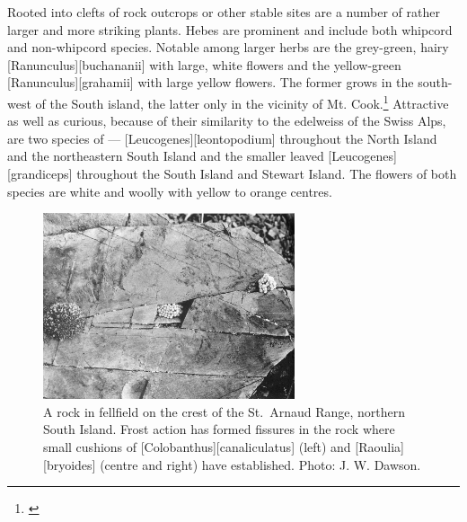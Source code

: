 Rooted into clefts of rock outcrops or other stable sites are a number of rather larger and more striking plants.
Hebes are prominent and include both whipcord and non-whipcord species.
Notable among larger herbs are the grey-green, hairy [Ranunculus][buchananii] with large, white flowers and the yellow-green [Ranunculus][grahamii] with large yellow flowers.
The former grows in the south-west of the South island, the latter only in the vicinity of Mt.
Cook.\footnote{\cite{wilson1978wild}}
Attractive as well as curious, because of their similarity to the edelweiss of the Swiss Alps, are two species of  --- [Leucogenes][leontopodium] throughout the North Island and the northeastern South Island and the smaller leaved [Leucogenes][grandiceps] throughout the South Island and Stewart Island.
The flowers of both species are white and woolly with yellow to orange centres.

\begin{figure}
	\includegraphics[width=0.66\textwidth]{graphics/figure107fellfield-rock.jpg}
	\centering
	\caption[A rock in fellfield on the crest of the St.\ Arnaud Range]{A rock in fellfield on the crest of the St.\ Arnaud Range, northern South Island.
	Frost action has formed fissures in the rock where small cushions of [Colobanthus][canaliculatus] (left) and [Raoulia][bryoides] (centre and right) have established.
	Photo: J. W. Dawson.}%
	\label{fig:107fellfield-rock}
\end{figure}

